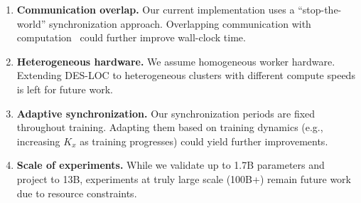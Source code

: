 \begin{enumerate}
\item \textbf{Communication overlap.} Our current implementation uses a ``stop-the-world'' synchronization approach. Overlapping communication with computation~\citep{douillard2025streaming} could further improve wall-clock time.

\item \textbf{Heterogeneous hardware.} We assume homogeneous worker hardware. Extending DES-LOC to heterogeneous clusters with different compute speeds is left for future work.

\item \textbf{Adaptive synchronization.} Our synchronization periods are fixed throughout training. Adapting them based on training dynamics (e.g., increasing $K_x$ as training progresses) could yield further improvements.

\item \textbf{Scale of experiments.} While we validate up to 1.7B parameters and project to 13B, experiments at truly large scale (100B+) remain future work due to resource constraints.
\end{enumerate}
